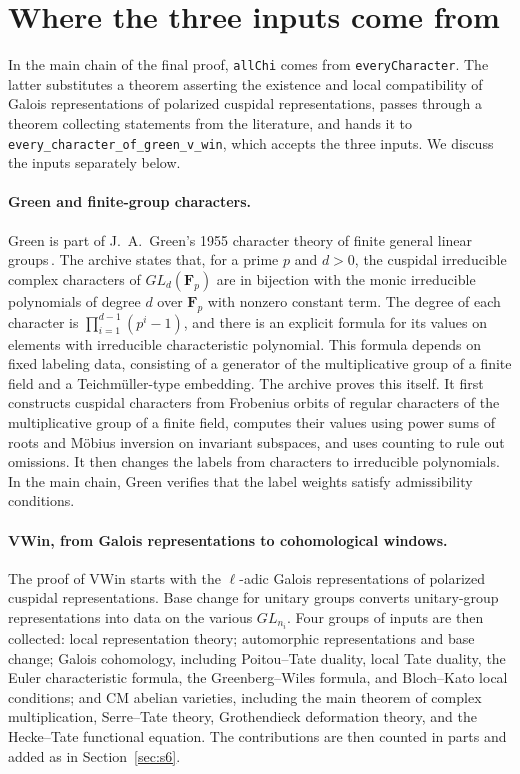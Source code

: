 \documentclass[11pt]{article}
\newcommand{\Lean}[1]{\texttt{\small #1}}
\begin{document}
\section{Where the three inputs come from}\label{sec:inputs}

In the main chain of the final proof, \Lean{allChi} comes from \Lean{everyCharacter}. The latter substitutes a theorem asserting the existence and local compatibility of Galois representations of polarized cuspidal representations, passes through a theorem collecting statements from the literature, and hands it to \Lean{every\_character\_of\_green\_v\_win}, which accepts the three inputs. We discuss the inputs separately below.

\paragraph{\textsf{Green} and finite-group characters.} \textsf{Green} is part of J.~A.~Green's 1955 character theory of finite general linear groups\,\cite{green}. The archive states that, for a prime $p$ and $d>0$, the cuspidal irreducible complex characters of $GL_d(\mathbf F_p)$ are in bijection with the monic irreducible polynomials of degree $d$ over $\mathbf F_p$ with nonzero constant term. The degree of each character is $\prod_{i=1}^{d-1}(p^i-1)$, and there is an explicit formula for its values on elements with irreducible characteristic polynomial. This formula depends on fixed labeling data, consisting of a generator of the multiplicative group of a finite field and a Teichmüller-type embedding. The archive proves this itself. It first constructs cuspidal characters from Frobenius orbits of regular characters of the multiplicative group of a finite field, computes their values using power sums of roots and Möbius inversion on invariant subspaces, and uses counting to rule out omissions. It then changes the labels from characters to irreducible polynomials. In the main chain, \textsf{Green} verifies that the label weights satisfy admissibility conditions.

\paragraph{\textsf{VWin}, from Galois representations to cohomological windows.} The proof of \textsf{VWin} starts with the $\ell$-adic Galois representations of polarized cuspidal representations. Base change for unitary groups converts unitary-group representations into data on the various $GL_{n_i}$. Four groups of inputs are then collected: local representation theory; automorphic representations and base change; Galois cohomology, including Poitou--Tate duality, local Tate duality, the Euler characteristic formula, the Greenberg--Wiles formula, and Bloch--Kato local conditions; and CM abelian varieties, including the main theorem of complex multiplication, Serre--Tate theory, Grothendieck deformation theory, and the Hecke--Tate functional equation. The contributions are then counted in parts and added as in Section~\ref{sec:s6}.
\end{document}
